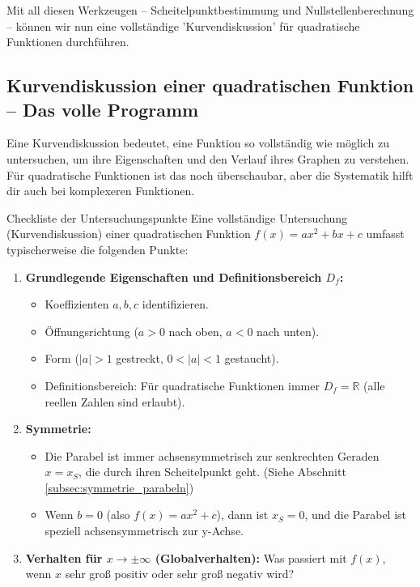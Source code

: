 Mit all diesen Werkzeugen – Scheitelpunktbestimmung und Nullstellenberechnung – können wir nun eine vollständige 'Kurvendiskussion' für quadratische Funktionen durchführen.

\subsection{Kurvendiskussion einer quadratischen Funktion – Das volle Programm}

Eine Kurvendiskussion bedeutet, eine Funktion so vollständig wie möglich zu untersuchen, um ihre Eigenschaften und den Verlauf ihres Graphen zu verstehen. Für quadratische Funktionen ist das noch überschaubar, aber die Systematik hilft dir auch bei komplexeren Funktionen.

\begin{merksatzumgebung}{Checkliste der Untersuchungspunkte}
Eine vollständige Untersuchung (Kurvendiskussion) einer quadratischen Funktion $f(x)=ax^2+bx+c$ umfasst typischerweise die folgenden Punkte:
\begin{enumerate}
    \item \textbf{Grundlegende Eigenschaften und Definitionsbereich $D_f$:}
        \begin{itemize}
            \item Koeffizienten $a, b, c$ identifizieren.
            \item Öffnungsrichtung ($a>0$ nach oben, $a<0$ nach unten).
            \item Form ($|a|>1$ gestreckt, $0<|a|<1$ gestaucht).
            \item Definitionsbereich: Für quadratische Funktionen immer $D_f = \mathbb{R}$ (alle reellen Zahlen sind erlaubt).
        \end{itemize}
    \item \textbf{Symmetrie:}
        \begin{itemize}
            \item Die Parabel ist immer achsensymmetrisch zur senkrechten Geraden $x = x_S$, die durch ihren Scheitelpunkt geht. (Siehe Abschnitt \ref{subsec:symmetrie_parabeln})
            \item Wenn $b=0$ (also $f(x)=ax^2+c$), dann ist $x_S=0$, und die Parabel ist speziell achsensymmetrisch zur y-Achse.
        \end{itemize}
    \item \textbf{Verhalten für $x \to \pm \infty$ (Globalverhalten):} Was passiert mit $f(x)$, wenn $x$ sehr groß positiv oder sehr groß negativ wird?

\end{enumerate}
\end{merksatzumgebung}
